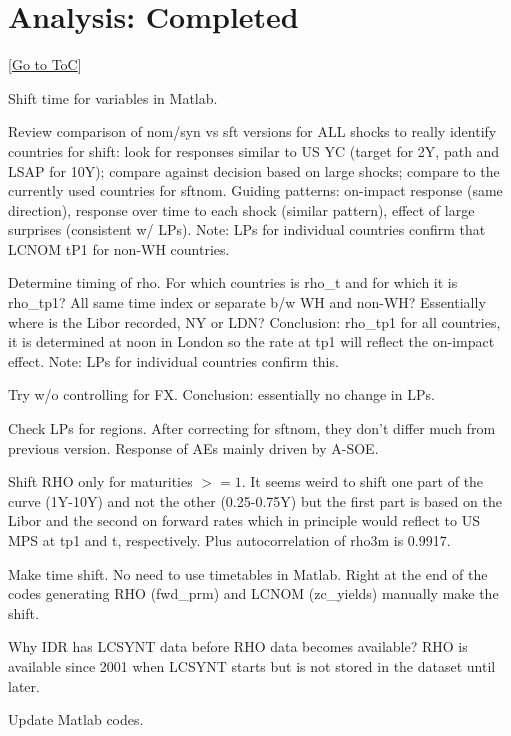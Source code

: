 \documentclass[12pt]{article}
\newcommand{\gototoc}{\vspace{-1.8cm} \null\hfill [\hyperlink{toc}{Go to ToC}] \newline}
\newcommand{\cmark}{\ding{51}}
\newcommand{\done}{\rlap{$\square$}{\raisebox{2pt}{\large\hspace{1pt}\cmark}}%
	\hspace{-2.5pt}}
\begin{document}
\section{Analysis: Completed}
\gototoc
	\begin{todolist}
	\item[\done] Shift time for variables in Matlab.
	\begin{todolist}
		\item[\done] Review comparison of nom/syn vs sft versions for ALL shocks to really identify countries for shift: look for responses similar to US YC (target for 2Y, path and LSAP for 10Y); compare against decision based on large shocks; compare to the currently used countries for sftnom. Guiding patterns: on-impact response (same direction), response over time to each shock (similar pattern), effect of large surprises (consistent w/ LPs). Note: LPs for individual countries confirm that LCNOM tP1 for non-WH countries.
		\item[\done] Determine timing of rho. For which countries is rho_t and for which it is rho_tp1? All same time index or separate b/w WH and non-WH? Essentially where is the Libor recorded, NY or LDN? Conclusion: rho_tp1 for all countries, it is determined at noon in London so the rate at tp1 will reflect the on-impact effect. Note: LPs for individual countries confirm this.
		\item[\done] Try w/o controlling for FX. Conclusion: essentially no change in LPs.
		\item[\done] Check LPs for regions. After correcting for sftnom, they don't differ much from previous version. Response of AEs mainly driven by A-SOE.
		\item[\done] Shift RHO only for maturities \(>= 1\). It seems weird to shift one part of the curve (1Y-10Y) and not the other (0.25-0.75Y) but the first part is based on the Libor and the second on forward rates which in principle would reflect to US MPS at tp1 and t, respectively. Plus autocorrelation of rho3m is 0.9917.
		\item[\done] Make time shift. No need to use timetables in Matlab. Right at the end of the codes generating RHO (fwd_prm) and LCNOM (zc_yields) manually make the shift.
		\item[\done] Why IDR has LCSYNT data before RHO data becomes available? RHO is available since 2001 when LCSYNT starts but is not stored in the dataset until later.
	\end{todolist}
	\item[\done] Update Matlab codes.

\end{todolist}
\end{document}
